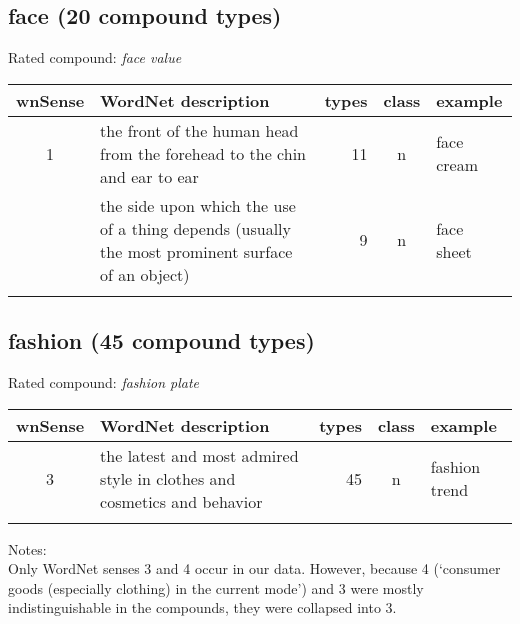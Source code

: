 \subsection{face         (20 compound types)}
Rated compound: \emph{face value}

\vspace*{1ex}

\noindent
\begin{longtable}{c>{\raggedright\arraybackslash}p{5cm}rc>{\raggedright\arraybackslash}p{2cm}}\lsptoprule
{\small wnSense}&WordNet description&types&class&example\\\midrule
1&the front of the human head from the forehead to the chin and ear to ear&11&n&face cream\\\tablevspace
8&the side upon which the use of a thing depends (usually the most prominent surface of an object)&9&n&face sheet\\\lspbottomrule
\end{longtable}

\subsection{fashion      (45 compound types)}
Rated compound: \emph{fashion plate}

\vspace*{1ex}

\noindent
\begin{longtable}{c>{\raggedright\arraybackslash}p{5cm}rc>{\raggedright\arraybackslash}p{2cm}}\lsptoprule
{\small wnSense}&WordNet description&types&class&example\\\midrule
3&the latest and most admired style in clothes and cosmetics and behavior&45&n&fashion trend\\\lspbottomrule
\end{longtable}
\noindent
Notes:\\
Only WordNet senses 3 and 4 occur in our data. However, because 4
(`consumer goods (especially clothing) in the current mode') and 3
were 
mostly indistinguishable in the compounds, they were collapsed into 3.

